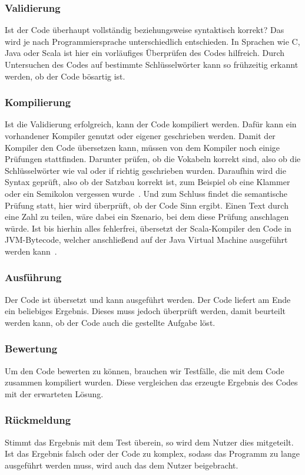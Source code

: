 	\subsubsection{Validierung}
	Ist der Code überhaupt vollständig beziehungsweise syntaktisch korrekt? Das wird je nach Programmiersprache unterschiedlich entschieden. In Sprachen wie C, Java oder Scala ist hier ein vorläufiges Überprüfen des Codes hilfreich. Durch Untersuchen des Codes auf bestimmte Schlüsselwörter kann so frühzeitig erkannt werden, ob der Code bösartig ist.
	
	\subsubsection{Kompilierung}
	Ist die Validierung erfolgreich, kann der Code kompiliert werden. Dafür kann ein vorhandener Kompiler genutzt oder eigener geschrieben werden. Damit der Kompiler den Code übersetzen kann, müssen von dem Kompiler noch einige Prüfungen stattfinden. Darunter prüfen, ob die Vokabeln korrekt sind, also ob die Schlüsselwörter wie val oder if richtig geschrieben wurden. Daraufhin wird die Syntax geprüft, also ob der Satzbau korrekt ist, zum Beispiel ob eine Klammer oder ein Semikolon vergessen wurde~\cite{sestoft2017plc}. Und zum Schluss findet die semantische Prüfung statt, hier wird überprüft, ob der Code Sinn ergibt. Einen Text durch eine Zahl zu teilen, wäre dabei ein Szenario, bei dem diese Prüfung anschlagen würde.
Ist bis hierhin alles fehlerfrei, übersetzt der Scala-Kompiler den Code in JVM-Bytecode, welcher anschließend auf der Java Virtual Machine ausgeführt werden kann~\cite{DottyRepo}.
	
	\subsubsection{Ausführung}
	Der Code ist übersetzt und kann ausgeführt werden. Der Code liefert am Ende ein beliebiges Ergebnis. Dieses muss jedoch überprüft werden, damit beurteilt werden kann, ob der Code auch die gestellte Aufgabe löst.

	\subsubsection{Bewertung}
	Um den Code bewerten zu können, brauchen wir Testfälle, die mit dem Code zusammen kompiliert wurden. Diese vergleichen das erzeugte Ergebnis des Codes mit der erwarteten Lösung.
	
	\subsubsection{Rückmeldung}
	Stimmt das Ergebnis mit dem Test überein, so wird dem Nutzer dies mitgeteilt. Ist das Ergebnis falsch oder der Code zu komplex, sodass das Programm zu lange ausgeführt werden muss, wird auch das dem Nutzer beigebracht.
	
